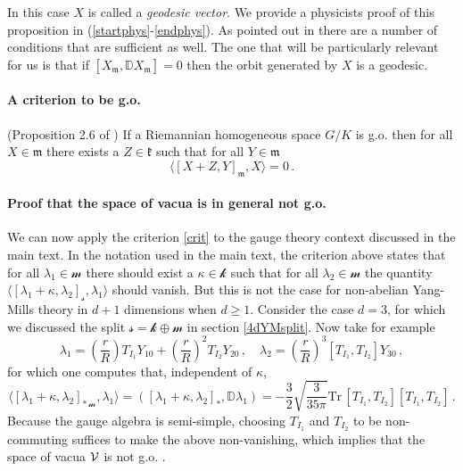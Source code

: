 \documentclass[11pt,a4paper]{article}
\def\calsk{\boldsymbol{\mathscr k}}
\def\calsm{{\boldsymbol{\mathscr m}}}
\def\calss{{\boldsymbol{\mathscr s}}}
\def\calv{{\cal V}}
\def\Tr{\mathrm{Tr}}
\def\Dperp{{\mathbb{D}}}
\begin{document}
    In this case $X$ is called a {\it geodesic vector}. We provide a physicists proof of this proposition in (\ref{startphys}-\ref{endphys}). As pointed out in \cite{arvanitogeorgos2003introduction} there are a number of conditions that are sufficient as well. The one that will be particularly relevant for us is that if $[X_\mathfrak{m},\Dperp X_\mathfrak{m}]=0$ then the orbit generated by $X$ is a geodesic.
    
    \paragraph{A criterion to be g.o.} (Proposition 2.6 of \cite{KowVa}) If a Riemannian homogeneous space $G/K$ is g.o. then for all $X\in\mathfrak{m}$ there exists a $Z\in\mathfrak{k}$ such that for all $Y\in\mathfrak{m}$
    \begin{equation}
    \langle[X+Z,Y]_\mathfrak{m},X\rangle=0\label{crit}\,.
    \end{equation}
    
    \paragraph{Proof that the space of vacua is in general not g.o.}
    We can now apply the criterion \eqref{crit} to the gauge theory context discussed in the main text. In the notation used in the main text, the criterion above states that for all $\lambda_1\in\calsm$ there should exist a $\kappa\in\calsk$ such that for all $\lambda_2\in\calsm$ the quantity  $\langle[\lambda_1+\kappa,\lambda_2]_\calss,\lambda_1\rangle$ should vanish. But this is not the case for non-abelian Yang-Mills theory in $d+1$ dimensions when $d\geq1$.  Consider the case $d=3$, for which we discussed the split $\calss=\calsk\oplus\calsm$ in section \ref{4dYMsplit}. Now take for example
    \begin{equation*}
    \lambda_1=\left(\frac{r}{R}\right)T_{I_1} Y_{10}+\left(\frac{r}{R}\right)^2T_{I_2} Y_{20}\,,\quad \lambda_2=\left(\frac{r}{R}\right)^3[T_{I_1},T_{I_2}] Y_{30}\,,
    \end{equation*}
    for which one computes that, independent of $\kappa$, 
    \begin{equation*}
    \langle[\lambda_1+\kappa,\lambda_2]_{*\,\calsm},\lambda_1\rangle=\left([\lambda_1+\kappa,\lambda_2]_*,\Dperp\lambda_1\right)=-\frac{3}{2} \sqrt{\frac{3}{35 \pi }}\Tr\, [T_{I_1},T_{I_2}][T_{I_1},T_{I_2}]\,.
    \end{equation*}
    Because the gauge algebra is semi-simple, choosing $T_{I_1}$ and $T_{I_2}$ to be non-commuting suffices to make the above non-vanishing, which implies that the space of vacua $\calv$ is not g.o. .
    
\end{document}
